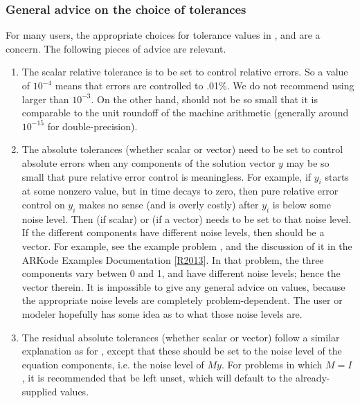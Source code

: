 \documentclass[letterpaper,10pt,english]{sphinxmanual}
\begin{document}
\subsubsection{General advice on the choice of tolerances}
\label{c_interface/User_callable:general-advice-on-the-choice-of-tolerances}
For many users, the appropriate choices for tolerance values in
,  and  are a concern. The following pieces
of advice are relevant.
\begin{enumerate}
\item {} 
The scalar relative tolerance  is to be set to control
relative errors. So a value of $10^{-4}$ means that errors
are controlled to .01\%. We do not recommend using  larger
than $10^{-3}$. On the other hand,  should not be so
small that it is comparable to the unit roundoff of the machine
arithmetic (generally around $10^{-15}$ for double-precision).

\item {} 
The absolute tolerances  (whether scalar or vector) need
to be set to control absolute errors when any components of the
solution vector $y$ may be so small that pure relative error
control is meaningless.  For example, if $y_i$ starts at some
nonzero value, but in time decays to zero, then pure relative
error control on $y_i$ makes no sense (and is overly costly)
after $y_i$ is below some noise level. Then  (if
scalar) or  (if a vector) needs to be set to that
noise level. If the different components have different noise
levels, then  should be a vector.  For example, see the
example problem , and the discussion
of it in the ARKode Examples Documentation {\hyperref[References:r2013]{{[}R2013{]}}}.  In that
problem, the three components vary betwen 0 and 1, and have
different noise levels; hence the  vector therein. It is
impossible to give any general advice on  values,
because the appropriate noise levels are completely
problem-dependent. The user or modeler hopefully has some idea as
to what those noise levels are.

\item {} 
The residual absolute tolerances  (whether scalar or
vector) follow a similar explanation as for , except
that these should be set to the noise level of the equation
components, i.e. the noise level of $My$.  For problems in
which $M=I$, it is recommended that  be left
unset, which will default to the already-supplied 
values.


\end{enumerate}
\end{document}
